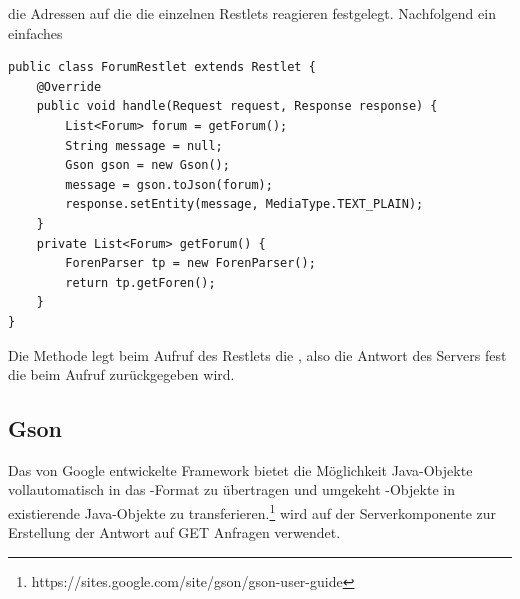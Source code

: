 die Adressen auf die die einzelnen Restlets reagieren festgelegt. Nachfolgend
ein einfaches 
\begin{lstlisting}[caption=Ein einfaches Restlet, label=restlet]
public class ForumRestlet extends Restlet {
	@Override
    public void handle(Request request, Response response) {
		List<Forum> forum = getForum();
        String message = null;
        Gson gson = new Gson();
        message = gson.toJson(forum);
        response.setEntity(message, MediaType.TEXT_PLAIN);
    }
	private List<Forum> getForum() {
		ForenParser tp = new ForenParser();
		return tp.getForen();
	}
}
\end{lstlisting}
Die Methode  legt beim Aufruf
des Restlets die , also die Antwort des Servers fest die
beim Aufruf zurückgegeben wird.
\subsection{Gson}
Das von Google entwickelte Framework  bietet die Möglichkeit
Java-Objekte vollautomatisch in das -Format zu übertragen und
umgekeht -Objekte in existierende Java-Objekte zu
transferieren.\footnote{https://sites.google.com/site/gson/gson-user-guide} 
 wird auf der Serverkomponente zur Erstellung der Antwort auf
GET Anfragen verwendet. 
